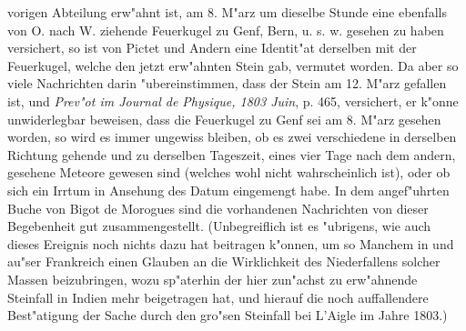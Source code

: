 \documentclass[a4paper, 11pt, oneside, polutonikogreek, german]{article}
\begin{document}
vorigen Abteilung erw"ahnt ist, am 8. M"arz um dieselbe Stunde eine ebenfalls von O. nach W. ziehende Feuerkugel zu Genf, Bern, u. s. w. gesehen zu haben versichert, so ist von Pictet und Andern eine Identit"at derselben mit der Feuerkugel, welche den jetzt erw"ahnten Stein gab, vermutet worden. Da aber so viele Nachrichten darin "ubereinstimmen, dass der Stein am 12. M"arz gefallen ist, und \emph{Prev"ot im Journal de Physique, 1803 Juin}, p. 465, versichert, er k"onne unwiderlegbar beweisen, dass die Feuerkugel zu Genf sei am 8. M"arz gesehen worden, so wird es immer ungewiss bleiben, ob es zwei verschiedene in derselben Richtung gehende und zu derselben Tageszeit, eines vier Tage nach dem andern, gesehene Meteore gewesen sind (welches wohl nicht wahrscheinlich ist), oder ob sich ein Irrtum in Ansehung des Datum eingemengt habe. In dem angef"uhrten Buche von Bigot de Morogues sind die vorhandenen Nachrichten von dieser Begebenheit gut zusammengestellt. (Unbegreiflich ist es "ubrigens, wie auch dieses Ereignis noch nichts dazu hat beitragen k"onnen, um so Manchem in und au"ser Frankreich einen Glauben an die Wirklichkeit des Niederfallens solcher Massen beizubringen, wozu sp"aterhin der hier zun"achst zu erw"ahnende Steinfall in Indien mehr beigetragen hat, und hierauf die noch auffallendere Best"atigung der Sache durch den gro"sen Steinfall bei L'Aigle im Jahre 1803.)
\end{document}
